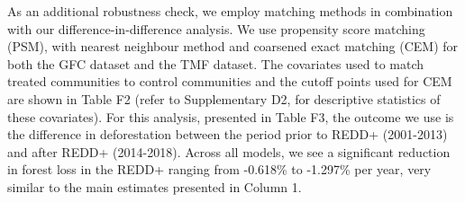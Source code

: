 \documentclass[
]{article}
\begin{document}
As an additional robustness check, we employ matching methods in
combination with our difference-in-difference analysis. We use
propensity score matching (PSM), with nearest neighbour method and
coarsened exact matching (CEM) for both the GFC dataset and the TMF
dataset. The covariates used to match treated communities to control
communities and the cutoff points used for CEM are shown in Table F2
(refer to Supplementary D2, for descriptive statistics of these
covariates). For this analysis, presented in Table F3, the outcome we
use is the difference in deforestation between the period prior to REDD+
(2001-2013) and after REDD+ (2014-2018). Across all models, we see a
significant reduction in forest loss in the REDD+ ranging from -0.618\%
to -1.297\% per year, very similar to the main estimates presented in
Column 1.
\end{document}
